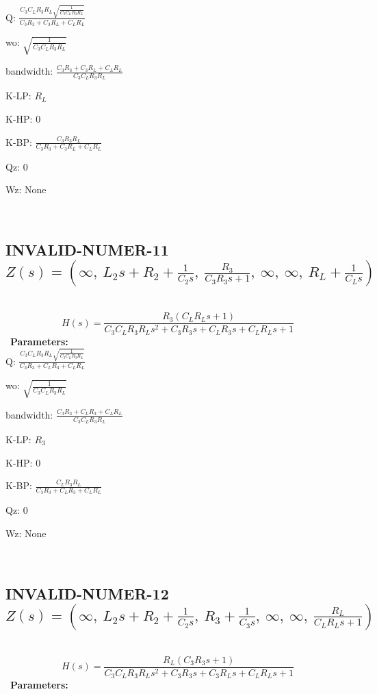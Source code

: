 \documentclass{article}
\begin{document}
Q: $\frac{C_{3} C_{L} R_{3} R_{L} \sqrt{\frac{1}{C_{3} C_{L} R_{3} R_{L}}}}{C_{3} R_{3} + C_{3} R_{L} + C_{L} R_{L}}$\ 

wo: $\sqrt{\frac{1}{C_{3} C_{L} R_{3} R_{L}}}$\ 

bandwidth: $\frac{C_{3} R_{3} + C_{3} R_{L} + C_{L} R_{L}}{C_{3} C_{L} R_{3} R_{L}}$\ 

K-LP: $R_{L}$\ 

K-HP: $0$\ 

K-BP: $\frac{C_{3} R_{3} R_{L}}{C_{3} R_{3} + C_{3} R_{L} + C_{L} R_{L}}$\ 

Qz: $0$\ 

Wz: $\text{None}$\ 

\ 

\subsection{INVALID-NUMER-11 $Z(s) = \left( \infty, \  L_{2} s + R_{2} + \frac{1}{C_{2} s}, \  \frac{R_{3}}{C_{3} R_{3} s + 1}, \  \infty, \  \infty, \  R_{L} + \frac{1}{C_{L} s}\right)$ } \ 
\textbf{\[H(s) = \frac{R_{3} \left(C_{L} R_{L} s + 1\right)}{C_{3} C_{L} R_{3} R_{L} s^{2} + C_{3} R_{3} s + C_{L} R_{3} s + C_{L} R_{L} s + 1}\] } \ 
\textbf{Parameters:}\\ 

Q: $\frac{C_{3} C_{L} R_{3} R_{L} \sqrt{\frac{1}{C_{3} C_{L} R_{3} R_{L}}}}{C_{3} R_{3} + C_{L} R_{3} + C_{L} R_{L}}$\ 

wo: $\sqrt{\frac{1}{C_{3} C_{L} R_{3} R_{L}}}$\ 

bandwidth: $\frac{C_{3} R_{3} + C_{L} R_{3} + C_{L} R_{L}}{C_{3} C_{L} R_{3} R_{L}}$\ 

K-LP: $R_{3}$\ 

K-HP: $0$\ 

K-BP: $\frac{C_{L} R_{3} R_{L}}{C_{3} R_{3} + C_{L} R_{3} + C_{L} R_{L}}$\ 

Qz: $0$\ 

Wz: $\text{None}$\ 

\ 

\subsection{INVALID-NUMER-12 $Z(s) = \left( \infty, \  L_{2} s + R_{2} + \frac{1}{C_{2} s}, \  R_{3} + \frac{1}{C_{3} s}, \  \infty, \  \infty, \  \frac{R_{L}}{C_{L} R_{L} s + 1}\right)$ } \ 
\textbf{\[H(s) = \frac{R_{L} \left(C_{3} R_{3} s + 1\right)}{C_{3} C_{L} R_{3} R_{L} s^{2} + C_{3} R_{3} s + C_{3} R_{L} s + C_{L} R_{L} s + 1}\] } \ 
\textbf{Parameters:}\\ 
\end{document}
